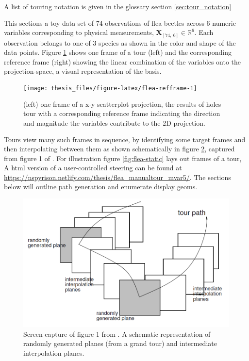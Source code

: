 \documentclass{monashthesis}
\begin{document}
A list of touring notation is given in the glossary section
\ref{sec:tour_notation}

This sections a toy data set of 74 observations of flea beetles across 6
numeric variables corresponding to physical measurements,
\(\textbf{X}_{[74,~6]} \in \mathbb{R}^{6}\). Each observation belongs to
one of 3 species as shown in the color and shape of the data points.
Figure \ref{fig:flea-refframe} shows one frame of a tour (left) and the
corresponding reference frame (right) showing the linear combination of
the variables onto the projection-space, a visual representation of the
basis.

\begin{figure}

{\centering \texttt{[image: thesis\_files/figure-latex/flea-refframe-1]} 

}

\caption{(left) one frame of a x-y scatterplot projection, the results of holes tour with a corresponding reference frame indicating the direction and magnitude the variables contribute to the 2D projection.}\label{fig:flea-refframe}
\end{figure}

Tours view many such frames in sequence, by identifying some target
frames and then interpolating between them as shown schematically in
figure \ref{fig:buja05fig}, captured from figure 1 of
\textcite{buja_computational_2005}. For illustration figure
\ref{fig:flea-static} lays out frames of a tour, A html version of a
user-controlled steering can be found at
\url{https://nspyrison.netlify.com/thesis/flea_manualtour_mvar5/}. The
sections below will outline path generation and enumerate display geoms.






\begin{figure}

{\centering \includegraphics[width=0.7\linewidth]{./figures/buja05fig} 

}

\caption{Screen capture of figure 1 from
\textcite{buja_computational_2005}. A schematic representation of
randomly generated planes (from a grand tour) and intermediate
interpolation planes.}\label{fig:buja05fig}
\end{figure}
\end{document}
